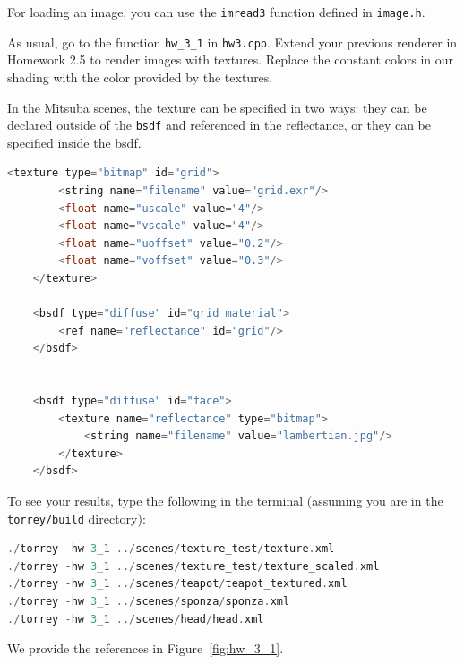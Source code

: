 For loading an image, you can use the \lstinline{imread3} function defined in \lstinline{image.h}.

As usual, go to the function \lstinline{hw_3_1} in \lstinline{hw3.cpp}. Extend your previous renderer in Homework 2.5 to render images with textures. Replace the constant colors in our shading with the color provided by the textures.

In the Mitsuba scenes, the texture can be specified in two ways: they can be declared outside of the \lstinline{bsdf} and referenced in the reflectance, or they can be specified inside the bsdf.
\begin{lstlisting}[language=C++]
    <texture type="bitmap" id="grid">
        <string name="filename" value="grid.exr"/>
        <float name="uscale" value="4"/>
        <float name="vscale" value="4"/>
        <float name="uoffset" value="0.2"/>
        <float name="voffset" value="0.3"/>
    </texture>

    <bsdf type="diffuse" id="grid_material">
        <ref name="reflectance" id="grid"/>
    </bsdf>


    <bsdf type="diffuse" id="face">
        <texture name="reflectance" type="bitmap">
            <string name="filename" value="lambertian.jpg"/>
        </texture>
    </bsdf>
\end{lstlisting}

To see your results, type the following in the terminal (assuming you are in the \lstinline{torrey/build} directory):
\begin{lstlisting}[language=C++]
./torrey -hw 3_1 ../scenes/texture_test/texture.xml
./torrey -hw 3_1 ../scenes/texture_test/texture_scaled.xml
./torrey -hw 3_1 ../scenes/teapot/teapot_textured.xml
./torrey -hw 3_1 ../scenes/sponza/sponza.xml
./torrey -hw 3_1 ../scenes/head/head.xml
\end{lstlisting}
We provide the references in Figure~\ref{fig:hw_3_1}.

